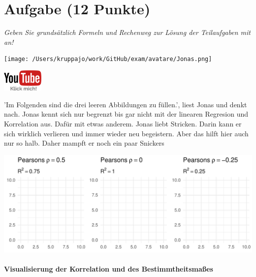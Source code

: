 \documentclass[a4paper, 9pt]{scrartcl}\usepackage[]{graphicx}\usepackage[]{xcolor}
\makeatletter
\def\maxwidth{ %
  \ifdim\Gin@nat@width>\linewidth
    \linewidth
  \else
    \Gin@nat@width
  \fi
}
\makeatother
\begin{document}
\section{Aufgabe \hfill (12 Punkte)}

\textit{Geben Sie grundsätzlich Formeln und Rechenweg zur Lösung der Teilaufgaben mit an!} \\[1Ex]
 

 
\begin{minipage}[t]{0.5\textwidth}
\texttt{[image: /Users/kruppajo/work/GitHub/exam/avatare/Jonas.png]}
\end{minipage}
\begin{minipage}[t]{0.5\textwidth}
\hfill
\href{https://youtu.be/fB6nF4dxodA}{\includegraphics[width = 2cm]{img/youtube}}
\end{minipage}
\vspace{-3ex}



'Im Folgenden sind die drei leeren Abbildungen zu füllen.', liest Jonas und denkt nach. Jonas kennt sich nur begrenzt bis gar nicht mit der linearen Regresion und Korrelation aus. Dafür mit etwas anderem. Jonas liebt Stricken. Darin kann er sich wirklich verlieren und immer wieder neu begeistern. Aber das hilft hier auch nur so halb. Daher mampft er noch ein paar Snickers
\vspace{2Ex}



{\centering \includegraphics[width=\maxwidth]{img/correlation-01-1} 

}




\paragraph{Visualisierung der Korrelation und des Bestimmtheitsmaßes}
\end{document}
